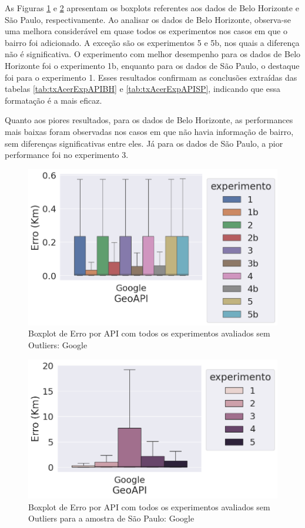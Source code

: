 As Figuras \ref{fig:boxplot-api-google-semout-bh} e \ref{fig:boxplot-api-google-semout-sp} apresentam os boxplots referentes aos dados de Belo Horizonte e São Paulo, respectivamente. Ao analisar os dados de Belo Horizonte, observa-se uma melhora considerável em quase todos os experimentos nos casos em que o bairro foi adicionado. A exceção são os experimentos 5 e 5b, nos quais a diferença não é significativa. O experimento com melhor desempenho para os dados de Belo Horizonte foi o experimento 1b, enquanto para os dados de São Paulo, o destaque foi para o experimento 1. Esses resultados confirmam as conclusões extraídas das tabelas \ref{tab:txAcerExpAPIBH} e \ref{tab:txAcerExpAPISP}, indicando que essa formatação é a mais eficaz.

Quanto aos piores resultados, para os dados de Belo Horizonte, as performances mais baixas foram observadas nos casos em que não havia informação de bairro, sem diferenças significativas entre eles. Já para os dados de São Paulo, a pior performance foi no experimento 3.


\begin{figure}[h]
    \centering
    \includegraphics[width=\textwidth]{Figuras/boxplotApiGoogleSemOut.png}
    \caption{Boxplot de Erro por API com todos os experimentos avaliados sem Outliers: Google}
    \label{fig:boxplot-api-google-semout-bh}
\end{figure}


\begin{figure}[h]
  \centering
  \includegraphics[width=\textwidth]{Figuras/boxplotApiGoogleSemOutsp.png}
  \caption{Boxplot de Erro por API com todos os experimentos avaliados sem Outliers para a amostra de São Paulo: Google}
  \label{fig:boxplot-api-google-semout-sp}
\end{figure}



